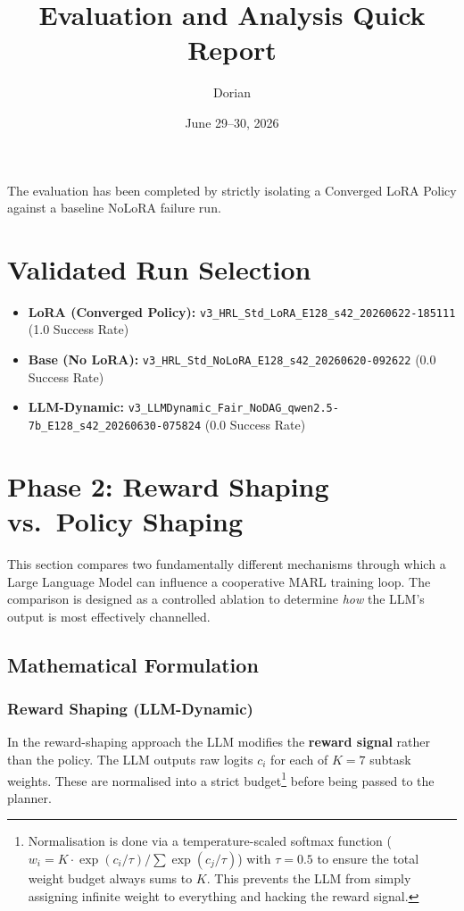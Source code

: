 \documentclass{article}
\title{Evaluation and Analysis Quick Report}
\author{Dorian}
\date{June 29--30, 2026}
\begin{document}
\maketitle

The evaluation has been completed by strictly isolating a Converged LoRA Policy against a baseline NoLoRA failure run.

\section{Validated Run Selection}
\begin{itemize}
    \item \textbf{LoRA (Converged Policy):} \texttt{v3\_HRL\_Std\_LoRA\_E128\_s42\_20260622-185111} (1.0 Success Rate)
    \item \textbf{Base (No LoRA):} \texttt{v3\_HRL\_Std\_NoLoRA\_E128\_s42\_20260620-092622} (0.0 Success Rate)
    \item \textbf{LLM-Dynamic:} \texttt{v3\_LLMDynamic\_Fair\_NoDAG\_qwen2.5-7b\_E128\_s42\_20260630-075824} (0.0 Success Rate)
\end{itemize}

\section{Phase 2: Reward Shaping vs.\ Policy Shaping}

This section compares two fundamentally different mechanisms through which a Large Language Model can influence a cooperative MARL training loop.  The comparison is designed as a controlled ablation to determine \emph{how} the LLM's output is most effectively channelled.

\subsection{Mathematical Formulation}

\subsubsection{Reward Shaping (LLM-Dynamic)}

In the reward-shaping approach the LLM modifies the \textbf{reward signal} rather than the policy.
The LLM outputs raw logits $c_i$ for each of $K{=}7$ subtask weights. These are normalised into a strict budget\footnote{Normalisation is done via a temperature-scaled softmax function ($w_i = K \cdot \exp(c_i / \tau) / \sum \exp(c_j / \tau)$) with $\tau=0.5$ to ensure the total weight budget always sums to $K$. This prevents the LLM from simply assigning infinite weight to everything and hacking the reward signal.} before being passed to the planner.
\end{document}
